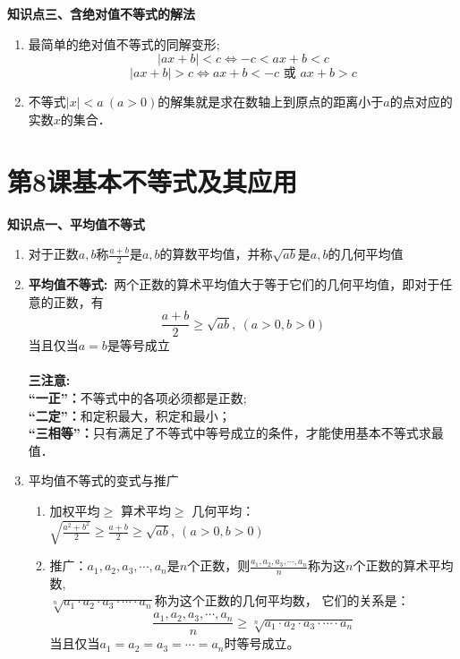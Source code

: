 \documentclass[11pt,a4paper]{ctexbook}
\begin{document}
\begin{formal}
    {\large \textbf{知识点三、含绝对值不等式的解法}}
\end{formal}

\begin{enumerate}
    \item 最简单的绝对值不等式的同解变形;
    $$
    |ax+b|<c \Leftrightarrow -c<ax+b<c 
    $$
    $$
    |ax+b|>c \Leftrightarrow ax+b<-c \text{\  或 \ }  ax+b>c
    $$
    \item 不等式$ |x|<a\ (a>0)$的解集就是求在数轴上到原点的距离小于$a$的点对应的实数$x$的集合．

\end{enumerate}
\clearpage
\section{第8课\quad 基本不等式及其应用}


\begin{formal}
    {\large \textbf{知识点一、平均值不等式}}
\end{formal}


\begin{enumerate}
    \item 对于正数$a,b$称$\displaystyle \frac{a+b}{2}\text{是}a,b\text{的算数平均值，并称}\sqrt{ab}\text{是}a,b\text{的几何平均值}$

    \item {\large{\textbf{平均值不等式:}}}\ 两个正数的算术平均值大于等于它们的几何平均值，即对于任意的正数，有
    $$
    \frac{a+b}{2}\ge \sqrt{ab},\ (a>0,b>0)
    $$
    当且仅当$a=b$是等号成立\\
    \\
    {\large{\textbf{三注意:}}}\\
    {\large{\textbf{“一正”：}}}不等式中的各项必须都是正数; \\
    {\large{\textbf{“二定”：}}}和定积最大，积定和最小； \\
    {\large{\textbf{“三相等”：}}}只有满足了不等式中等号成立的条件，才能使用基本不等式求最值．\\
    \item 平均值不等式的变式与推广
    \begin{enumerate}
        \item 加权平均$\ge$ 算术平均$\ge$ 几何平均：$\displaystyle \sqrt{\frac{a^2+b^2}{2}}\ge \frac{a+b}{2} \ge \sqrt{ab} , \ (a>0,b>0)$
    
        \item { 推广：$ a_1,a_2,a_3,\cdots,a_n$是$n$个正数，则$\displaystyle \frac{a_1,a_2,a_3,\cdots,a_n}{n}$称为这$n$个正数的算术平均数,\\ 
        $\sqrt[n]{a_1\cdot a_2\cdot a_3\cdot \cdots \cdot a_n}$称为这个正数的几何平均数，
        它们的关系是：
        $$\displaystyle \frac{a_1,a_2,a_3,\cdots,a_n}{n} \ge \sqrt[n]{a_1\cdot a_2\cdot a_3\cdot \cdots \cdot a_n}$$
        当且仅当$  a_1=a_2=a_3=\cdots=a_n$时等号成立。}
    \end{enumerate}
\end{enumerate}
\end{document}
